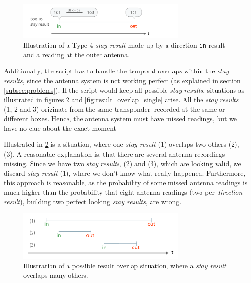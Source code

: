 \begin{figure}[htpb]
\begin{center}
  \includegraphics[width=0.75\textwidth]{assets/pdf/stay_result_type_4_schema.pdf}
  \caption[Illustration of a type 4 \textit{stay result}]{Illustration of a Type 4 \textit{stay result} made up by a direction \lstinline|in| result and a reading at the outer antenna.}
  \label{fig:type_4_stay_result}
\end{center}
\end{figure}

Additionally, the script has to handle the temporal overlaps within the \textit{stay results}, since the antenna system is not working perfect (as explained in section \ref{subsec:problems}). If the script would keep all possible \textit{stay results}, situations as illustrated in figures \ref{fig:result_overlap} and \ref{fig:result_overlap_single} arise. All the \textit{stay results} (1, 2 and 3) originate from the same transponder, recorded at the same or different boxes. Hence, the antenna system must have missed readings, but we have no clue about the exact moment.  

Illustrated in \ref{fig:result_overlap} is a situation, where one \textit{stay result} (1) overlaps two others (2),(3). A reasonable explanation is, that there are several antenna recordings missing. Since we have two \textit{stay results}, (2) and (3), which are looking valid, we discard \textit{stay result} (1), where we don't know what really happened. Furthermore, this approach is reasonable, as the probability of some missed antenna readings is much higher than the probability that eight antenna readings (two per \textit{direction result}), building two perfect looking \textit{stay results}, are wrong.
 
\begin{figure}[htpb]
\begin{center}
  \includegraphics[width=0.75\textwidth]{assets/pdf/result_overlaps_schema.pdf}
  \caption[Illustration of a possible result overlap situation]{Illustration of a possible result overlap situation, where a \textit{stay result} overlaps many others.}
  \label{fig:result_overlap}
\end{center}
\end{figure}

